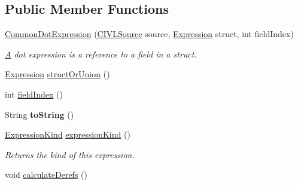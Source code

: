 \subsection*{Public Member Functions}
\begin{DoxyCompactItemize}
\item 
\hyperlink{classedu_1_1udel_1_1cis_1_1vsl_1_1civl_1_1model_1_1common_1_1expression_1_1CommonDotExpression_aec4081a17e5e7d39c865bc2bddcdecad}{Common\+Dot\+Expression} (\hyperlink{interfaceedu_1_1udel_1_1cis_1_1vsl_1_1civl_1_1model_1_1IF_1_1CIVLSource}{C\+I\+V\+L\+Source} source, \hyperlink{interfaceedu_1_1udel_1_1cis_1_1vsl_1_1civl_1_1model_1_1IF_1_1expression_1_1Expression}{Expression} struct, int field\+Index)
\begin{DoxyCompactList}\small\item\em \hyperlink{structA}{A} dot expression is a reference to a field in a struct. \end{DoxyCompactList}\item 
\hyperlink{interfaceedu_1_1udel_1_1cis_1_1vsl_1_1civl_1_1model_1_1IF_1_1expression_1_1Expression}{Expression} \hyperlink{classedu_1_1udel_1_1cis_1_1vsl_1_1civl_1_1model_1_1common_1_1expression_1_1CommonDotExpression_a90ebf026262cb827e25e7654b5a7ab46}{struct\+Or\+Union} ()
\item 
int \hyperlink{classedu_1_1udel_1_1cis_1_1vsl_1_1civl_1_1model_1_1common_1_1expression_1_1CommonDotExpression_a742c5b423d5828e26c44dd1fa53b4c41}{field\+Index} ()
\item 
\hypertarget{classedu_1_1udel_1_1cis_1_1vsl_1_1civl_1_1model_1_1common_1_1expression_1_1CommonDotExpression_aea0f0cf85ca758f3c70bd0ff3f697dc3}{}String {\bfseries to\+String} ()\label{classedu_1_1udel_1_1cis_1_1vsl_1_1civl_1_1model_1_1common_1_1expression_1_1CommonDotExpression_aea0f0cf85ca758f3c70bd0ff3f697dc3}

\item 
\hyperlink{enumedu_1_1udel_1_1cis_1_1vsl_1_1civl_1_1model_1_1IF_1_1expression_1_1Expression_1_1ExpressionKind}{Expression\+Kind} \hyperlink{classedu_1_1udel_1_1cis_1_1vsl_1_1civl_1_1model_1_1common_1_1expression_1_1CommonDotExpression_a80dce36fd45d170543d2549774c1630d}{expression\+Kind} ()
\begin{DoxyCompactList}\small\item\em Returns the kind of this expression. \end{DoxyCompactList}\item 
\hypertarget{classedu_1_1udel_1_1cis_1_1vsl_1_1civl_1_1model_1_1common_1_1expression_1_1CommonDotExpression_a8a5dbe4395ba7919d1b14cc601dddc26}{}void \hyperlink{classedu_1_1udel_1_1cis_1_1vsl_1_1civl_1_1model_1_1common_1_1expression_1_1CommonDotExpression_a8a5dbe4395ba7919d1b14cc601dddc26}{calculate\+Derefs} ()\label{classedu_1_1udel_1_1cis_1_1vsl_1_1civl_1_1model_1_1common_1_1expression_1_1CommonDotExpression_a8a5dbe4395ba7919d1b14cc601dddc26}


\end{DoxyCompactItemize}
